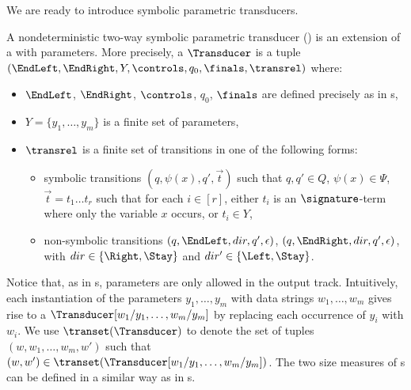 We are ready to introduce symbolic parametric transducers.

\begin{definition}
A nondeterministic two-way symbolic parametric transducer (\SSPT) is an extension of a \SST{} with parameters. More precisely,  a \SSPT{} $\Transducer$ is a tuple
$(\EndLeft, \EndRight, Y, \controls, q_0, \finals, \transrel)$ where:
\begin{itemize}
%
\item $\EndLeft$, $\EndRight$, $\controls$, $q_0$, $\finals$ are defined precisely as in \SST{}s, 
%
\item $Y=\{y_1,\ldots, y_m\}$ is a finite set of parameters, 
%
\item $\transrel$ is a finite set of transitions in one of the following forms: 
\begin{itemize}
\item symbolic transitions $(q, \psi(x), q', \vec{t})$ such that $q,q' \in Q$, $\psi(x) \in \Psi$,
$\vec{t} = t_1 \ldots t_r$ such that for each $i \in [r]$, either $t_i$ is an $\signature$-term where only the variable $x$ occurs, or $t_i \in Y$,
%
\item non-symbolic transitions $(q, \EndLeft, dir, q', \epsilon)$, $(q, \EndRight, dir, q', \epsilon)$, with $dir \in \{\Right, \Stay\}$ and $dir' \in \{\Left, \Stay\}$. 
\end{itemize}
\end{itemize}
\end{definition}

Notice that, as in \PPT{}s, parameters are only allowed in the output track.
Intuitively, each instantiation of the parameters $y_1,\ldots, y_m$ with data strings 
$w_1,\ldots, w_m$ gives rise to a \SST{} $\Transducer[w_1/y_1,\ldots, w_m/y_m]$ by replacing each occurrence of $y_i$ with $w_i$. 
%
We use $\transet(\Transducer)$ to denote the set of tuples $(w, w_1, \ldots, w_m, w')$ such that $(w, w') \in \transet(\Transducer[w_1/y_1,\ldots, w_m/y_m])$.
The two size measures of \SSPT{}s can be defined in a similar way as in \SST{}s. 



